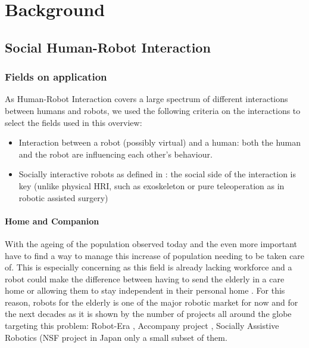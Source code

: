 \chapter{Background} \label{chap:background}

\section{Social Human-Robot Interaction}

\subsection{Fields on application}

As Human-Robot Interaction covers a large spectrum of different interactions between humans and robots, we used the following criteria on the interactions to select the fields used in this overview:
\begin{itemize}
\item Interaction between a robot (possibly virtual) and a human: both the human and the robot are influencing each other's behaviour.
\item Socially interactive robots as defined in \citep{Fong2003}: the social
    side of the interaction is key (unlike physical HRI, such as exoskeleton or
    pure teleoperation as in robotic assisted surgery)
\end{itemize}

\subsubsection{Home and Companion}

    With the ageing of the population observed today and the even more important
    have to find a way to manage this increase of population needing to be taken
    care of. This is especially concerning as this field is already lacking
    workforce and a robot could make the difference between having to send the
    elderly in a care home or allowing them to stay independent in their
    personal home \citep{di2014web}. For this reason, robots for the elderly is
    one of the major robotic market for now and for the next decades as it is
    shown by the number of projects all around the globe targeting this problem:
    Robot-Era \citep{bevilacqua2012robot}, Accompany project
    \citep{amirabdollahian2013accompany}, Socially Assistive Robotics (NSF
    project in Japan
    only a small subset of them.	
	
